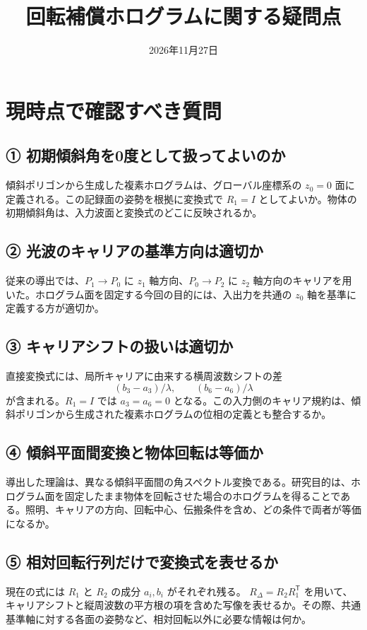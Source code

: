 \documentclass[a4paper,10pt]{ltjsarticle}
\title{回転補償ホログラムに関する疑問点}
\author{}
\date{2026年11月27日}
\begin{document}
\maketitle
\section{現時点で確認すべき質問}
\subsection*{① 初期傾斜角を0度として扱ってよいのか}
傾斜ポリゴンから生成した複素ホログラムは、グローバル座標系の $z_0=0$ 面に定義される。この記録面の姿勢を根拠に変換式で $R_1=I$ としてよいか。物体の初期傾斜角は、入力波面と変換式のどこに反映されるか。

\subsection*{② 光波のキャリアの基準方向は適切か}
従来の導出では、$P_1\to P_0$ に $z_1$ 軸方向、$P_0\to P_2$ に $z_2$ 軸方向のキャリアを用いた。ホログラム面を固定する今回の目的には、入出力を共通の $z_0$ 軸を基準に定義する方が適切か。

\subsection*{③ キャリアシフトの扱いは適切か}
直接変換式には、局所キャリアに由来する横周波数シフトの差
\[
  (b_3-a_3)/\lambda,\qquad (b_6-a_6)/\lambda
\]
が含まれる。$R_1=I$ では $a_3=a_6=0$ となる。この入力側のキャリア規約は、傾斜ポリゴンから生成された複素ホログラムの位相の定義とも整合するか。

\subsection*{④ 傾斜平面間変換と物体回転は等価か}
導出した理論は、異なる傾斜平面間の角スペクトル変換である。研究目的は、ホログラム面を固定したまま物体を回転させた場合のホログラムを得ることである。照明、キャリアの方向、回転中心、伝搬条件を含め、どの条件で両者が等価になるか。

\subsection*{⑤ 相対回転行列だけで変換式を表せるか}
現在の式には $R_1$ と $R_2$ の成分 $a_i,b_i$ がそれぞれ残る。
$R_\Delta=R_2R_1^{\mathsf T}$ を用いて、キャリアシフトと縦周波数の平方根の項を含めた写像を表せるか。その際、共通基準軸に対する各面の姿勢など、相対回転以外に必要な情報は何か。
\end{document}
